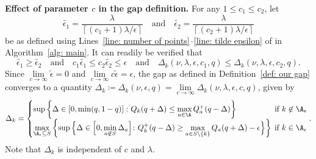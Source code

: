 \textbf{Effect of parameter $c$ in the gap definition.}
For any $1 \le c_1 \le c_2$, let 
\begin{equation}
\label{eq: tilde eps 1 and 2}
    \tilde{\epsilon_1} = \frac{\lambda} {\left\lceil (c_1+1) \lambda/\epsilon \right\rceil}
    \quad 
    \text{and}
    \quad
    \tilde{\epsilon_2} =  \frac{\lambda} {\left\lceil (c_2+1) \lambda/\epsilon \right\rceil}
\end{equation} 
be as defined 
using Lines~\ref{line: number of points}--\ref{line: tilde epsilon} of 
in Algorithm~\ref{alg: main}. It can readily be verified that 
\begin{equation}
\label{eq: c1 tilde eps 1 and 2}
    \tilde{\epsilon_1} \ge \tilde{\epsilon_2}
    \quad \text{and} \quad
    c_1 \tilde{\epsilon_1} \le c_2 \tilde{\epsilon_2} \le \epsilon
    \quad \text{and} \quad
    \Delta_{k}(\nu, \lambda, \epsilon, c_1, q)
\le \Delta_{k}(\nu, \lambda, \epsilon, c_2, q).
\end{equation}
Since $\lim\limits_{c \to \infty}  \tilde{\epsilon} = 0$
and $\lim\limits_{c \to \infty} c \tilde{\epsilon} = \epsilon$,
the gap as defined in Definition~\ref{def: our gap} converges to a quantity $\Delta_{k} \coloneqq \Delta_{k}(\nu, \epsilon, 
    q) = \lim\limits_{c \to \infty}
    \Delta_{k}(\nu, \lambda, \epsilon, c, q)$, given by
\begin{equation}
\begin{aligned}
\label{eq: gap k infinite c}
   \Delta_{k} =
    \begin{cases}
    \sup
    \left\{
        \Delta \in \left[0, \min(q, 1-q) \right]
        \colon
        Q_k(q + \Delta) 
        \le
        \max\limits_{a \in \A  }
        Q^+_{a}(q - \Delta) 
        \right\}
    &\hspace{-2mm} \text{if }  k \not\in \A_{\epsilon} \\
   \max\limits_{\A_{\epsilon} \subseteq S }
   \left\{
        \sup
    \Big\{
        \Delta \in 
       \Big[0, \min\limits_{a \not\in S} \Delta_{a}  \Big]
        \colon
        Q^+_k(q - \Delta) 
        \ge
        \max\limits_{ a \in S \setminus \{k\}} 
        Q_{a}(q + \Delta) - \epsilon
        \Big\}
        \right\}
    &\hspace{-2mm} \text{if } k \in \A_{\epsilon} 
    \end{cases}.
\end{aligned}
\end{equation}
    Note that $\Delta_k$ is independent of $c$ and $\lambda$.
    

